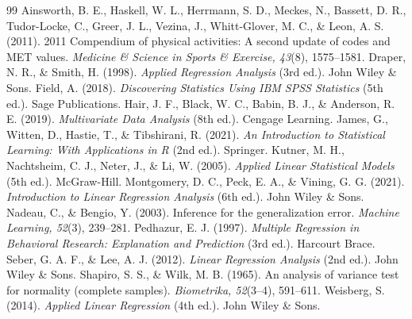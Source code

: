 \documentclass[12pt,a4paper]{report}
\begin{document}
\begin{thebibliography}{99}
 Ainsworth, B. E., Haskell, W. L., Herrmann, S. D., Meckes, N., Bassett, D. R., Tudor-Locke, C., Greer, J. L., Vezina, J., Whitt-Glover, M. C., \& Leon, A. S. (2011). 2011 Compendium of physical activities: A second update of codes and MET values. \textit{Medicine \& Science in Sports \& Exercise, 43}(8), 1575--1581.
 Draper, N. R., \& Smith, H. (1998). \textit{Applied Regression Analysis} (3rd ed.). John Wiley \& Sons.
 Field, A. (2018). \textit{Discovering Statistics Using IBM SPSS Statistics} (5th ed.). Sage Publications.
 Hair, J. F., Black, W. C., Babin, B. J., \& Anderson, R. E. (2019). \textit{Multivariate Data Analysis} (8th ed.). Cengage Learning.
 James, G., Witten, D., Hastie, T., \& Tibshirani, R. (2021). \textit{An Introduction to Statistical Learning: With Applications in R} (2nd ed.). Springer.
 Kutner, M. H., Nachtsheim, C. J., Neter, J., \& Li, W. (2005). \textit{Applied Linear Statistical Models} (5th ed.). McGraw-Hill.
 Montgomery, D. C., Peck, E. A., \& Vining, G. G. (2021). \textit{Introduction to Linear Regression Analysis} (6th ed.). John Wiley \& Sons.
 Nadeau, C., \& Bengio, Y. (2003). Inference for the generalization error. \textit{Machine Learning, 52}(3), 239--281.
 Pedhazur, E. J. (1997). \textit{Multiple Regression in Behavioral Research: Explanation and Prediction} (3rd ed.). Harcourt Brace.
 Seber, G. A. F., \& Lee, A. J. (2012). \textit{Linear Regression Analysis} (2nd ed.). John Wiley \& Sons.
 Shapiro, S. S., \& Wilk, M. B. (1965). An analysis of variance test for normality (complete samples). \textit{Biometrika, 52}(3--4), 591--611.
 Weisberg, S. (2014). \textit{Applied Linear Regression} (4th ed.). John Wiley \& Sons.
\end{thebibliography}
\end{document}

